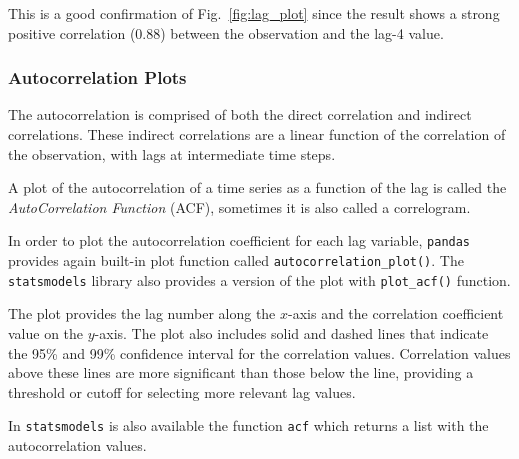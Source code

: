 This is a good confirmation of Fig.~\ref{fig:lag_plot} since the result 
shows a strong
positive correlation (0.88) between the observation and the lag-4 value.

\subsubsection{Autocorrelation Plots}
\label{autocorrelation-plots}

The autocorrelation is comprised of both the direct correlation and indirect correlations. These indirect correlations are a linear function of the correlation of the observation, with lags at intermediate time steps.

A plot of the autocorrelation of a time series as a function of the lag is called the \emph{AutoCorrelation Function} (ACF), sometimes it is also called a correlogram.

In order to plot the autocorrelation coefficient for each lag variable, \texttt{pandas} provides again built-in plot function called \texttt{autocorrelation\_plot()}. The \texttt{statsmodels} library also provides a version of the plot with \texttt{plot\_acf()} function.

The plot provides the lag number along the \(x\)-axis and the correlation coefficient value on the \(y\)-axis. The plot also includes solid and dashed lines that indicate the 95\% and 99\% confidence interval for the correlation values. Correlation values above these lines are more significant than those below the line, providing a threshold or cutoff for selecting more relevant lag values.

In \texttt{statsmodels} is also available the function \texttt{acf} which returns a list with the autocorrelation values.
%
%

